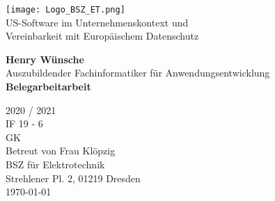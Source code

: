 \begin{titlepage}
    \begin{center}
        \texttt{[image: Logo\_BSZ\_ET.png]}\\
        \vspace*{1cm}
        {\huge{US-Software im Unternehmenskontext und\\Vereinbarkeit mit Europäischem Datenschutz}}

        \vspace{2cm}

        \textbf{Henry Wünsche}\\
        Auszubildender Fachinformatiker für Anwendungsentwicklung\\

        \vfill
        {\huge\textbf{Belegarbeitarbeit}}

        \vspace{1cm}
        {\Huge 2020 / 2021}\\
        \vspace{0.8cm}
        IF 19 - 6\\
        GK\\
        Betreut von Frau Klöpzig\\
        BSZ für Elektrotechnik\\
        Strehlener Pl. 2, 01219 Dresden\\
        \today

    \end{center}
\end{titlepage}
\pagebreak
